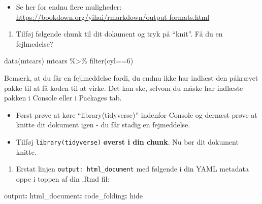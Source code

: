 \documentclass[
]{book}
\newenvironment{Shaded}{\begin{snugshade}}{\end{snugshade}}
\newcommand{\AttributeTok}[1]{\textcolor[rgb]{0.77,0.63,0.00}{#1}}
\newcommand{\DecValTok}[1]{\textcolor[rgb]{0.00,0.00,0.81}{#1}}
\newcommand{\FunctionTok}[1]{\textcolor[rgb]{0.00,0.00,0.00}{#1}}
\newcommand{\KeywordTok}[1]{\textcolor[rgb]{0.13,0.29,0.53}{\textbf{#1}}}
\newcommand{\NormalTok}[1]{#1}
\newcommand{\SpecialCharTok}[1]{\textcolor[rgb]{0.00,0.00,0.00}{#1}}
\providecommand{\tightlist}{%
  \setlength{\itemsep}{0pt}\setlength{\parskip}{0pt}}
\begin{document}
\begin{itemize}
\tightlist
\item
  Se her for endnu flere muligheder: \url{https://bookdown.org/yihui/rmarkdown/output-formats.html}
\end{itemize}

\begin{enumerate}
\def\labelenumi{\arabic{enumi})}
\setcounter{enumi}{7}
\tightlist
\item
  Tilføj følgende chunk til dit dokument og tryk på ``knit''. Få du en fejlmedelse?
\end{enumerate}

\begin{Shaded}
\begin{Highlighting}[]
\FunctionTok{data}\NormalTok{(mtcars)}
\NormalTok{mtcars }\SpecialCharTok{\%\textgreater{}\%} \FunctionTok{filter}\NormalTok{(cyl}\SpecialCharTok{==}\DecValTok{6}\NormalTok{)}
\end{Highlighting}
\end{Shaded}

Bemærk, at du får en fejlmeddelse fordi, du endnu ikke har indlæst den påkrævet pakke til at få koden til at virke. Det kan ske, selvom du måske har indlæste pakken i Console eller i Packages tab.

\begin{itemize}
\tightlist
\item
  Først prøve at køre ``library(tidyverse)'' indenfor Console og dernæst prøve at knitte dit dokument igen - du får stadig en fejmeddelse.
\item
  Tilføj \texttt{library(tidyverse)} \textbf{øverst i din chunk}. Nu bør dit dokument knitte.
\end{itemize}

\begin{enumerate}
\def\labelenumi{\arabic{enumi})}
\setcounter{enumi}{8}
\tightlist
\item
  Erstat linjen \texttt{output:\ html\_document} med følgende i din YAML metadata oppe i toppen af din .Rmd fil:
\end{enumerate}

\begin{Shaded}
\begin{Highlighting}[]
\FunctionTok{output}\KeywordTok{:}
\AttributeTok{  }\FunctionTok{html\_document}\KeywordTok{:}
\AttributeTok{    }\FunctionTok{code\_folding}\KeywordTok{:}\AttributeTok{ hide}
\end{Highlighting}
\end{Shaded}
\end{document}
